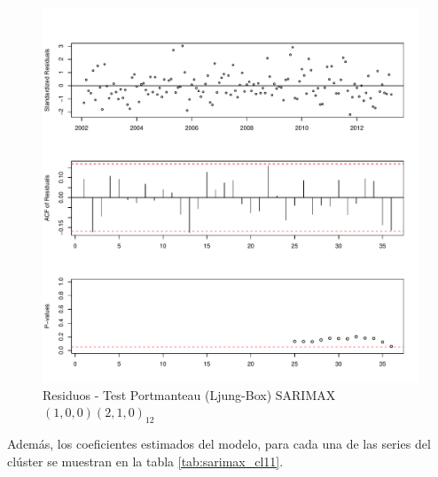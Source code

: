 \documentclass[12pt,oneside]{book}\usepackage[]{graphicx}\usepackage[]{color}
\makeatletter
\def\maxwidth{ %
  \ifdim\Gin@nat@width>\linewidth
    \linewidth
  \else
    \Gin@nat@width
  \fi
}
\newenvironment{knitrout}{}{} %
\theoremstyle{definition} %
\makeatother
\begin{document}
\begin{knitrout}
\color{fgcolor}\begin{figure}[h]

{\centering \includegraphics[width=\maxwidth]{figure/unnamed-chunk-96-1} 

}

\caption[Residuos - Test Portmanteau (Ljung-Box) SARIMAX$(1,0,0)(2,1,0)_{12}$]{Residuos - Test Portmanteau (Ljung-Box) SARIMAX$(1,0,0)(2,1,0)_{12}$}\label{fig:unnamed-chunk-96}
\end{figure}


\end{knitrout}


Además, los coeficientes estimados del modelo, para cada una de las series del clúster se muestran en la tabla \ref{tab:sarimax_cl11}.
\end{document}
